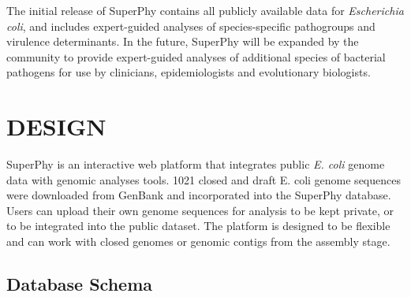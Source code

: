 \documentclass[a4paper,twoside]{article}
\begin{document}
The initial release of SuperPhy contains all publicly available data for \textit{Escherichia coli}, and includes expert-guided analyses of species-specific pathogroups and virulence determinants. In the future, SuperPhy will be expanded by the community to provide expert-guided analyses of additional species of bacterial pathogens for use by clinicians, epidemiologists and evolutionary biologists.

\section{\uppercase{Design}}
\label{sec:design}

\noindent SuperPhy is an interactive web platform that integrates public \textit{E. coli} genome data with genomic analyses tools. 1021 closed and draft E. coli genome sequences were downloaded from GenBank and incorporated into the SuperPhy database. Users can upload their own genome sequences for analysis to be kept private, or to be integrated into the public dataset. The platform is designed to be flexible and can work with closed genomes or genomic contigs from the assembly stage. 

\subsection{Database Schema}
\end{document}
